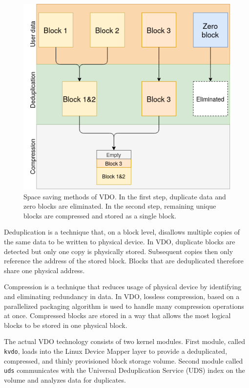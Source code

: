 \documentclass[
  color, %
  table, %
  lof,   %
  lot,   %
]{fithesis3}
\begin{document}
\begin{figure}[!htb]
        \centering
        \includegraphics[width=\textwidth]{graphics/diagrams/space_saving.png}
        \caption[Space saving methods in VDO]{Space saving methods of VDO. In the first step, duplicate data and zero blocks are eliminated. In the second step, remaining unique blocks are compressed and stored as a single block.}
\label{fig:space_saving}
\end{figure}


Deduplication is a technique that, on a block level, disallows multiple copies of the same data to be written to physical device. In VDO, duplicate blocks are detected but only one copy is physically stored. Subsequent copies then only reference the address of the stored block. Blocks that are deduplicated therefore share one physical address.

Compression is a technique that reduces usage of physical device by identifying and eliminating redundancy in data. In VDO, lossless compression, based on a parallelized packaging algorithm is used to handle many compression operations at once. Compressed blocks are stored in a way that allows the most logical blocks to be stored in one physical block.

The actual VDO technology consists of two kernel modules. First module, called \texttt{kvdo}, loads into the Linux Device Mapper layer to provide a deduplicated, compressed, and thinly provisioned block storage volume. Second module called \texttt{uds} communicates with the Universal Deduplication Service (UDS) index on the volume and analyzes data for duplicates.
\end{document}

